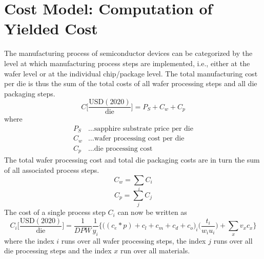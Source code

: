 \documentclass[parskip=full]{article}
\begin{document}
\section{Cost Model: Computation of Yielded Cost}
\label{sec:cost_computation}

The manufacturing process of semiconductor devices can be categorized by the level at which manufacturing process steps are implemented, i.e., either at the wafer level or at the individual chip/package level. The total manufacturing cost per die is thus the sum of the total costs of all wafer processing steps and all die packaging steps.
%
\begin{equation}
\label{eqn:cost_sum}
    C \bigg[ \frac{ \text{USD}(2020) }{ \text{die} } \bigg] = P_S + C_w + C_p
\end{equation}
%
where
%
\begin{align*}
    P_S &\dots \text{sapphire substrate price per die} \\
    C_w &\dots \text{wafer processing cost per die} \\
    C_p &\dots \text{die processing cost}
\end{align*}
%
The total wafer processing cost and total die packaging costs are in turn the sum of all associated process steps.
%
\begin{equation}
        C_w = \sum_i C_i
\end{equation}
%
\begin{equation}
	C_p = \sum_j C_j
\end{equation}
%
The cost of a single process step $C_i$ can now be written as
%
\begin{equation}
\label{eqn:cost_wafer}
    C_i \bigg[ \frac{ \text{USD}(2020) }{ \text{die} } \bigg] =\frac{1}{DPW}  \frac{1}{y_i}   \bigg\{ \bigg((c_e*p) + c_l + c_m + c_d + c_o \bigg)_i \bigg( \frac{t_i}{w_i u_i} \bigg) + \sum_{x} v_x c_x \bigg\}
\end{equation}
%
where the index $i$ runs over all wafer processing steps, the index $j$ runs over all die processing steps and the index $x$ run over all materials.
%
\end{document}

